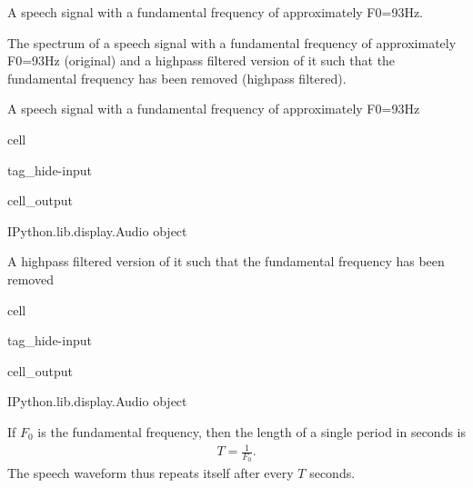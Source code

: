 \documentclass[letterpaper,10pt,english]{jupyterBook}
\begin{document}
\sphinxAtStartPar
A speech signal with a fundamental frequency of approximately F0=93Hz.

\sphinxAtStartPar
{}

\sphinxAtStartPar
The spectrum of a speech signal with a fundamental frequency of
approximately F0=93Hz (original) and a high\sphinxhyphen{}pass filtered version of it
such that the fundamental frequency has been removed (high\sphinxhyphen{}pass
filtered).

\sphinxAtStartPar
{}

\sphinxAtStartPar
A speech signal with a fundamental frequency of approximately F0=93Hz

\begin{sphinxuseclass}{cell}
\begin{sphinxuseclass}{tag_hide-input}\begin{sphinxVerbatimOutput}

\begin{sphinxuseclass}{cell_output}
\begin{sphinxVerbatim}[commandchars=\\\{\}]
\PYGZlt{}IPython.lib.display.Audio object\PYGZgt{}
\end{sphinxVerbatim}

\end{sphinxuseclass}\end{sphinxVerbatimOutput}

\end{sphinxuseclass}
\end{sphinxuseclass}
\sphinxAtStartPar
A high\sphinxhyphen{}pass
filtered version of it such that the fundamental frequency has been
removed

\begin{sphinxuseclass}{cell}
\begin{sphinxuseclass}{tag_hide-input}\begin{sphinxVerbatimOutput}

\begin{sphinxuseclass}{cell_output}
\begin{sphinxVerbatim}[commandchars=\\\{\}]
\PYGZlt{}IPython.lib.display.Audio object\PYGZgt{}
\end{sphinxVerbatim}

\end{sphinxuseclass}\end{sphinxVerbatimOutput}

\end{sphinxuseclass}
\end{sphinxuseclass}
\sphinxAtStartPar
If \(F_{0}\) is the fundamental frequency, then the length of a
single period in seconds is
\begin{equation*}
\begin{split} T=\frac{1}{F_0}. \end{split}
\end{equation*}
\sphinxAtStartPar
The speech waveform thus repeats itself after every \(T\) seconds.
\end{document}
